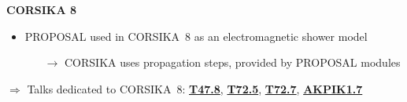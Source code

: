 \begin{frame}[c]
    \begin{columns}[onlytextwidth]
    \begin{column}{0.6\textwidth}
    \textbf{CORSIKA 8}
        \begin{itemize}
            \item PROPOSAL used in CORSIKA~8 as an electromagnetic shower model
            \begin{itemize}
                \item[$\rightarrow$] CORSIKA uses propagation steps, provided by PROPOSAL modules
            \end{itemize}
        \end{itemize}

        \hspace{10pt} $\Rightarrow$ Talks dedicated to CORSIKA~8: \href{https://www.dpg-verhandlungen.de/year/2022/conference/heidelberg/part/t/session/47/contribution/8}{\textbf{T47.8}}, \href{https://www.dpg-verhandlungen.de/year/2022/conference/heidelberg/part/t/session/72/contribution/5}{\textbf{T72.5}}, \href{https://www.dpg-verhandlungen.de/year/2022/conference/heidelberg/part/t/session/72/contribution/7}{\textbf{T72.7}}, \href{https://www.dpg-verhandlungen.de/year/2022/conference/heidelberg/part/akpik/session/1/contribution/7}{\textbf{AKPIK1.7}}


\end{column}
\end{columns}
\end{frame}
